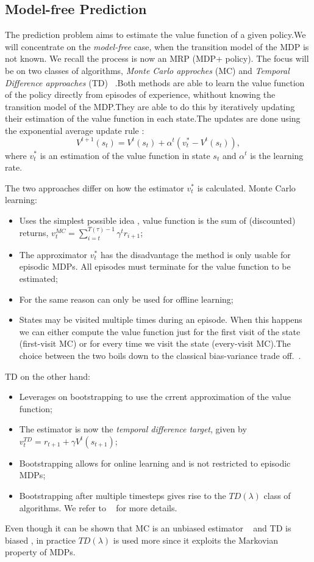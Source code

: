 \subsection{Model-free Prediction}
The prediction problem aims to estimate the value function of a given policy.We will concentrate on the \emph{model-free} case, \ie when the transition model of the MDP is not known. We recall the process is now an MRP (MDP+ policy). The focus will be on two classes of algorithms, \emph{ Monte Carlo approches} (MC) and \emph{Temporal Difference approaches} (TD) ~\cite{Sutton:1998:IRL:551283}.Both methods are able to learn the value function of the policy directly from episodes of experience, whithout knowing the transition model of the MDP.They are able to do this by iteratively updating their estimation of the value function in each state.The updates are done using the exponential average update rule :
\begin{equation}
	V^{t+1}(s_t)=V^{t}(s_t)+ \alpha^t\left(v^{*}_t-V^{t}(s_t) \right),
\end{equation}
where $v^{*}_t$ is an estimation of the value function in state $s_t$ and $\alpha^t$ is the learning rate.\par
The two approaches differ on how the estimator $v^{*}_t$ is calculated. Monte Carlo learning:
\begin{itemize}
	\item Uses the simplest possible idea , value function is the sum of  (discounted) returns, $v^{MC}_{t}=\sum_{i=t}^{T(\tau)-1} \gamma^{t} r_{i+1}$;
	\item The approximator $v^{*}_t$ has the disadvantage the method is only usable for episodic MDPs. All episodes must terminate for the value function to be estimated;
	\item For the same reason can only be used for offline learning;
	\item States may be visited multiple times during an episode. When this happens we can either compute the value function just for the first visit of the state (first-visit MC) or for every time we visit the state (every-visit MC).The choice between the two boils down to the classical bias-variance trade off.~\cite{Sutton:1998:IRL:551283}.
\end{itemize}\par
TD on the other hand:
\begin{itemize}
	\item Leverages on bootstrapping to use the crrent approximation of the value function;
	\item The estimator is now the \emph{temporal difference target}, given by $v^{TD}_t=r_{t+1}+ \gamma V^{t}(s_{t+1})$;
	\item Bootstrapping allows for online learning and is not restricted to episodic MDPs;
	\item Bootstrapping after multiple timesteps gives rise to the $TD(\lambda)$ class of algorithms. We refer to ~\cite{Sutton:1998:IRL:551283} for more details.
\end{itemize}\par
Even though it can be shown that MC is an unbiased estimator ~\cite{Sutton:1998:IRL:551283} and TD is biased , in practice $TD(\lambda)$ is used more since it exploits the Markovian property of MDPs.
